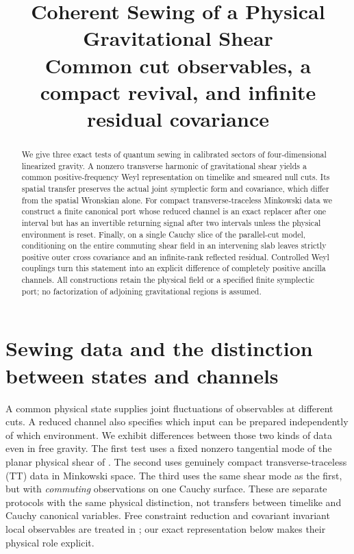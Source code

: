 \documentclass[11pt]{article}
\title{Coherent Sewing of a Physical Gravitational Shear\\
\large Common cut observables, a compact revival, and infinite residual covariance}
\author{}
\date{}
\begin{document}
\maketitle
\begin{abstract}
We give three exact tests of quantum sewing in calibrated sectors of four-dimensional linearized gravity. A nonzero transverse harmonic of gravitational shear yields a common positive-frequency Weyl representation on timelike and smeared null cuts. Its spatial transfer preserves the actual joint symplectic form and covariance, which differ from the spatial Wronskian alone. For compact transverse-traceless Minkowski data we construct a finite canonical port whose reduced channel is an exact replacer after one interval but has an invertible returning signal after two intervals unless the physical environment is reset. Finally, on a single Cauchy slice of the parallel-cut model, conditioning on the entire commuting shear field in an intervening slab leaves strictly positive outer cross covariance and an infinite-rank reflected residual. Controlled Weyl couplings turn this statement into an explicit difference of completely positive ancilla channels. All constructions retain the physical field or a specified finite symplectic port; no factorization of adjoining gravitational regions is assumed.
\end{abstract}

\section{Sewing data and the distinction between states and channels}

A common physical state supplies joint fluctuations of observables at different cuts. A reduced channel also specifies which input can be prepared independently of which environment. We exhibit differences between those two kinds of data even in free gravity. The first test uses a fixed nonzero tangential mode of the planar physical shear of \cite{sewing}. The second uses genuinely compact transverse-traceless (TT) data in Minkowski space. The third uses the same shear mode as the first, but with \emph{commuting} observations on one Cauchy surface. These are separate protocols with the same physical distinction, not transfers between timelike and Cauchy canonical variables. Free constraint reduction and covariant invariant local observables are treated in \cite{fewsterhunt,hack}; our exact representation below makes their physical role explicit.
\end{document}
